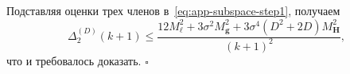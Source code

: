 Подставляя оценки трех членов в~\eqref{eq:app-subspace-step1}, получаем
\begin{equation}
    \Delta_2^{(D)}(k+1)
    \leqslant
    \frac{
        12M_\ell^2
        +
        3\sigma^2 M_{\mathbf g}^2
        +
        3\sigma^4(D^2+2D)M_{\mathbf H}^2
    }{(k+1)^2},
\end{equation}
что и требовалось доказать. \hfill$\square$
